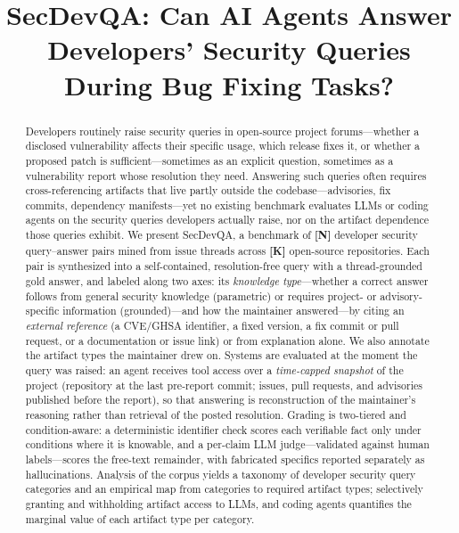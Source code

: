 \documentclass[10pt,conference]{IEEEtran}
\newif\ifshownums\shownumstrue
\newcommand{\dnum}[1]{\ifshownums\textcolor{red!75!black}{\textbf{#1}}\else#1\fi}
\begin{document}
\title{SecDevQA: Can AI Agents Answer Developers' Security Queries During Bug Fixing Tasks?}

\author{
}
\maketitle

\begin{abstract}
Developers routinely raise security queries in open-source project forums---whether a disclosed vulnerability affects their specific usage, which release fixes it, or whether a proposed patch is sufficient---sometimes as an explicit question, sometimes as a vulnerability report whose resolution they need. Answering such queries often requires cross-referencing artifacts that live partly outside the codebase---advisories, fix commits, dependency manifests---yet no existing benchmark evaluates LLMs or coding agents on the security queries developers actually raise, nor on the artifact dependence those queries exhibit. We present \mbox{SecDevQA}, a benchmark of \dnum{[N]} developer security query--answer pairs mined from issue threads across \dnum{[K]} open-source repositories. Each pair is synthesized into a self-contained, resolution-free query with a thread-grounded gold answer, and labeled along two axes: its \emph{knowledge type}---whether a correct answer follows from general security knowledge (parametric) or requires project- or advisory-specific information (grounded)---and how the maintainer answered---by citing an \emph{external reference} (a CVE/GHSA identifier, a fixed version, a fix commit or pull request, or a documentation or issue link) or from explanation alone. We also annotate the artifact types the maintainer drew on. Systems are evaluated at the moment the query was raised: an agent receives tool access over a \emph{time-capped snapshot} of the project (repository at the last pre-report commit; issues, pull requests, and advisories published before the report), so that answering is reconstruction of the maintainer's reasoning rather than retrieval of the posted resolution. Grading is two-tiered and condition-aware: a deterministic identifier check scores each verifiable fact only under conditions where it is knowable, and a per-claim LLM judge---validated against human labels---scores the free-text remainder, with fabricated specifics reported separately as hallucinations. Analysis of the corpus yields a taxonomy of developer security query categories and an empirical map from categories to required artifact types; selectively granting and withholding artifact access to LLMs, and coding agents quantifies the marginal value of each artifact type per category.
\end{abstract}
\end{document}
